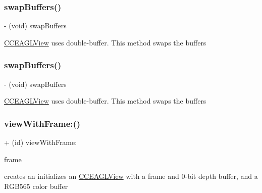 \subsubsection{\texorpdfstring{swap\+Buffers()}{swapBuffers()}\hspace{0.1cm}{\footnotesize\ttfamily [1/2]}}
{\footnotesize\ttfamily -\/ (void) swap\+Buffers \begin{DoxyParamCaption}{ }\end{DoxyParamCaption}}

\hyperlink{interfaceCCEAGLView}{C\+C\+E\+A\+G\+L\+View} uses double-\/buffer. This method swaps the buffers \mbox{\label{interfaceCCEAGLView_adb64cde54fee9dedd5004416f59fc0a7}} 
\subsubsection{\texorpdfstring{swap\+Buffers()}{swapBuffers()}\hspace{0.1cm}{\footnotesize\ttfamily [2/2]}}
{\footnotesize\ttfamily -\/ (void) swap\+Buffers \begin{DoxyParamCaption}{ }\end{DoxyParamCaption}}

\hyperlink{interfaceCCEAGLView}{C\+C\+E\+A\+G\+L\+View} uses double-\/buffer. This method swaps the buffers \mbox{\label{interfaceCCEAGLView_a288ea52be7dd891bbc9e0ee7e18cdf24}} 
\subsubsection{\texorpdfstring{view\+With\+Frame\+:()}{viewWithFrame:()}\hspace{0.1cm}{\footnotesize\ttfamily [1/2]}}
{\footnotesize\ttfamily + (id) view\+With\+Frame\+: \begin{DoxyParamCaption}\item[{(C\+G\+Rect)}]{frame }\end{DoxyParamCaption}}

creates an initializes an \hyperlink{interfaceCCEAGLView}{C\+C\+E\+A\+G\+L\+View} with a frame and 0-\/bit depth buffer, and a R\+G\+B565 color buffer \mbox{\label{interfaceCCEAGLView_a288ea52be7dd891bbc9e0ee7e18cdf24}} 
